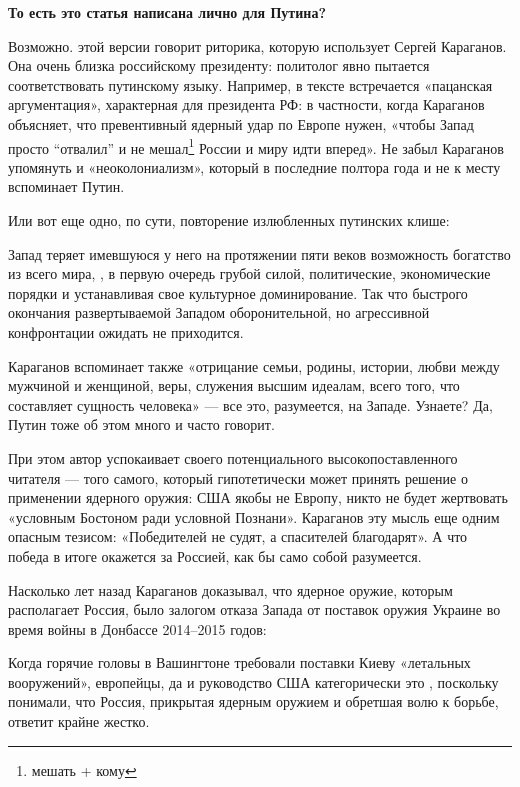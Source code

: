 \textbf{То есть это статья написана лично для Путина?}

Возможно.  этой версии говорит риторика, которую использует Сергей Караганов. Она очень близка российскому президенту: политолог явно пытается соответствовать путинскому языку. Например, в тексте встречается «пацанская аргументация», характерная для президента РФ: в частности, когда Караганов объясняет, что превентивный ядерный удар по Европе нужен, «чтобы Запад просто ``отвалил'' и не мешал\footnote{мешать + кому} России и миру идти вперед». Не забыл Караганов упомянуть и «неоколониализм», который в последние полтора года  и не к месту вспоминает Путин.

Или вот еще одно, по сути, повторение излюбленных путинских клише:

\begin{fancyquotes}
    Запад теряет имевшуюся у него на протяжении пяти веков возможность  богатство из всего мира, , в первую очередь грубой силой, политические, экономические порядки и устанавливая свое культурное доминирование. Так что быстрого окончания развертываемой Западом оборонительной, но агрессивной конфронтации ожидать не приходится.
\end{fancyquotes}

Караганов вспоминает также «отрицание семьи, родины, истории, любви между мужчиной и женщиной, веры, служения высшим идеалам, всего того, что составляет сущность человека» --- все это, разумеется, на Западе. Узнаете? Да, Путин тоже об этом много и часто говорит.

При этом автор успокаивает своего потенциального высокопоставленного читателя --- того самого, который гипотетически может принять решение о применении ядерного оружия: США якобы не  Европу, никто не будет жертвовать «условным Бостоном ради условной Познани». Караганов  эту мысль еще одним опасным тезисом: «Победителей не судят, а спасителей благодарят». А что победа в итоге окажется за Россией, как бы само собой разумеется.

Насколько лет назад Караганов доказывал, что ядерное оружие, которым располагает Россия, было залогом отказа Запада от поставок оружия Украине во время войны в Донбассе 2014–2015 годов:

\begin{fancyquotes}
    Когда горячие головы в Вашингтоне требовали поставки Киеву «летальных вооружений», европейцы, да и руководство США категорически это , поскольку понимали, что Россия, прикрытая ядерным оружием и обретшая волю к борьбе, ответит крайне жестко.
\end{fancyquotes}

